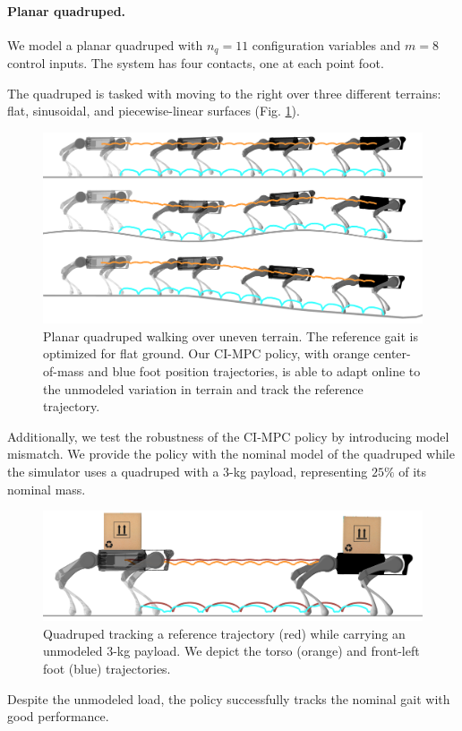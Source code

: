 \paragraph{Planar quadruped.}
We model a planar quadruped with $n_q = 11$ configuration variables and $m = 8$ control inputs. The system has four contacts, one at each point foot. 

The quadruped is tasked with moving to the right over three different terrains: flat, sinusoidal, and piecewise-linear surfaces (Fig. \ref{cipc_quadruped_traj}). 



\begin{figure}[H]
	\centering
	\includegraphics[width=.48\textwidth]{ci_pc/quadruped.png}
	\caption[Planar quadruped walking over uneven terrain]{Planar quadruped walking over uneven terrain. The reference gait is optimized for flat ground.  Our CI-MPC policy, with orange center-of-mass and blue foot position trajectories, is able to adapt online to the unmodeled variation in terrain and track the reference trajectory.}
	\label{cipc_quadruped_traj}
\end{figure}

Additionally, we test the robustness of the CI-MPC policy by introducing model mismatch. We provide the policy with the nominal model of the quadruped while the simulator uses a quadruped with a $3$-kg payload, representing $25\%$ of its nominal mass. 

\begin{figure}[H]
	\centering
	\includegraphics[width=.45\textwidth]{ci_pc/quadruped_payload_cardboard_red.png}
	\caption[Planar quadruped locomotion with model mismatch]{Quadruped tracking a reference trajectory (red) while carrying an unmodeled $3$-kg payload. We depict the torso (orange) and front-left foot (blue) trajectories.}
	\label{cipc_quadruped_payload}
\end{figure}

Despite the unmodeled load, the policy successfully tracks the nominal gait with good performance. 

